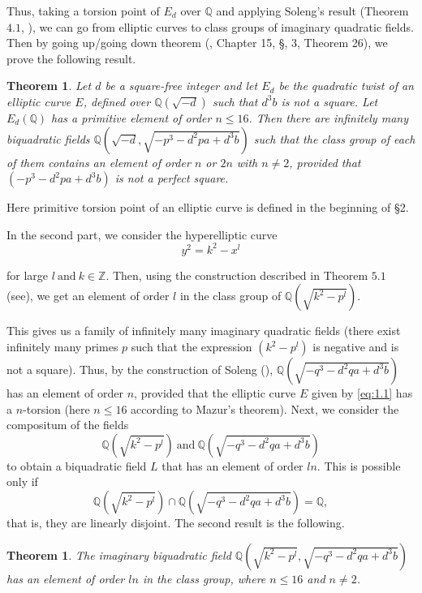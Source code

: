 \documentclass[12pt, 14paper]{amsart}
\theoremstyle{plain}
\newtheorem{theorem}[subsection]{Theorem}
\numberwithin{equation}{section}
\newcommand \QQ {{\mathbb Q}}
\begin{document}
Thus, taking a torsion point of $E_d$ over $\mathbb{Q}$ and applying Soleng's result (Theorem $4.1$, \cite{S}), we can go from elliptic curves to class groups of imaginary quadratic fields. Then by going up/going down theorem (\cite{DF07}, Chapter 15, \S, 3, Theorem 26), we prove the following result. 
\begin{theorem}
\label{Thm:1.1}
Let $d$ be a square-free integer and let $E_d$ be the quadratic twist of an elliptic curve $E$, defined over $\QQ(\sqrt{-d})$ such that $d^3 b$ is not a square. Let $E_d(\QQ)$ has a primitive element of order $n\leq 16$. Then there are infinitely many biquadratic fields $\QQ(\sqrt{-d},\sqrt{-p^3-d^2pa+d^3b})$ such that the class group of each of them contains an element of order $n$ or $2n$ with $n\neq 2$, provided that $(-p^3-d^2pa+d^3b)$ is not a perfect square.
\end{theorem}

Here primitive torsion point of an elliptic curve is defined in the beginning of \S2.

In the second part, we consider the hyperelliptic curve
\begin{equation}
\label{eq:1.4}
    y^2 =k^2 -x^l
\end{equation}

for large $l ~\text{and}~ k \in \mathbb{Z}$. Then, using the construction described in Theorem $5.1$ (see\cite{BH}), we get an element of order $l$ in the class group of $\QQ(\sqrt{k^2-p^l})$. 
 
 This gives us a family of infinitely many imaginary quadratic fields (there exist infinitely many primes $p$ such that the expression $(k^2-p^l)$ is negative and  is not a square). 
 Thus, by the construction of Soleng (\cite{S}), 
 $\QQ(\sqrt{-q^3-d^2qa+d^3b})$ has an element of order $n$, provided that the elliptic curve $E$ given by \eqref{eq:1.1} has a $n$-torsion (here $n \leq 16$ according to Mazur's theorem). Next, we consider the compositum of the fields 
$$
\QQ(\sqrt{k^2-p^l}) ~\text{and}~ \QQ(\sqrt{-q^3-d^2qa+d^3b})
$$
to obtain a biquadratic field $L$ that has an element of order $ln$. This is possible only if 
$$
 \QQ(\sqrt{k^2-p^l})\cap \QQ(\sqrt{-q^3-d^2qa+d^3b})=\QQ,
$$
that is, they are linearly disjoint. The second result is the following.
\begin{theorem}
\label{Thm:1.2}
 The imaginary biquadratic field $\QQ(\sqrt{k^2-p^l}, \sqrt{-q^3-d^2qa+d^3b})$ has an element of order $ln$ in the class group, where $n\leq 16$ and $n\neq 2$. 
\end{theorem}
\end{document}
